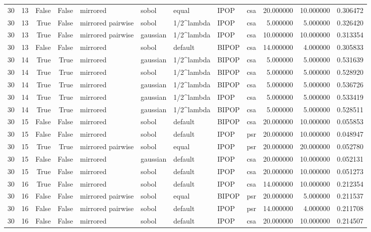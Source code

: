 \begin{tabular}{rrrrlllllrrr}
30 & 13 & False & False & mirrored & sobol & equal & IPOP & csa & 20.000000 & 10.000000 & 0.306472 \\
30 & 13 & True & False & mirrored pairwise & sobol & 1/2^lambda & IPOP & csa & 5.000000 & 5.000000 & 0.326420 \\
30 & 13 & True & False & mirrored pairwise & gaussian & 1/2^lambda & IPOP & csa & 10.000000 & 10.000000 & 0.313354 \\
30 & 13 & False & False & mirrored & sobol & default & BIPOP & csa & 14.000000 & 4.000000 & 0.305833 \\
30 & 14 & True & True & mirrored & gaussian & 1/2^lambda & BIPOP & csa & 5.000000 & 5.000000 & 0.531639 \\
30 & 14 & True & True & mirrored & sobol & 1/2^lambda & BIPOP & csa & 5.000000 & 5.000000 & 0.528920 \\
30 & 14 & True & True & mirrored & gaussian & 1/2^lambda & BIPOP & csa & 5.000000 & 5.000000 & 0.536726 \\
30 & 14 & True & True & mirrored & gaussian & 1/2^lambda & IPOP & csa & 5.000000 & 5.000000 & 0.533419 \\
30 & 14 & True & True & mirrored & gaussian & 1/2^lambda & BIPOP & csa & 5.000000 & 5.000000 & 0.528511 \\
30 & 15 & False & False & mirrored & sobol & default & BIPOP & csa & 20.000000 & 10.000000 & 0.055853 \\
30 & 15 & False & False & mirrored & sobol & default & IPOP & psr & 20.000000 & 10.000000 & 0.048947 \\
30 & 15 & True & True & mirrored pairwise & sobol & equal & IPOP & psr & 20.000000 & 20.000000 & 0.052780 \\
30 & 15 & False & False & mirrored & gaussian & default & IPOP & csa & 20.000000 & 10.000000 & 0.052131 \\
30 & 15 & True & False & mirrored & sobol & default & IPOP & csa & 20.000000 & 10.000000 & 0.051273 \\
30 & 16 & True & False & mirrored & sobol & default & IPOP & csa & 14.000000 & 10.000000 & 0.212354 \\
30 & 16 & False & False & mirrored pairwise & sobol & equal & BIPOP & psr & 20.000000 & 5.000000 & 0.211537 \\
30 & 16 & False & False & mirrored pairwise & sobol & default & IPOP & psr & 14.000000 & 4.000000 & 0.211708 \\
30 & 16 & False & False & mirrored & sobol & default & IPOP & csa & 20.000000 & 10.000000 & 0.214507 \\

\end{tabular}
